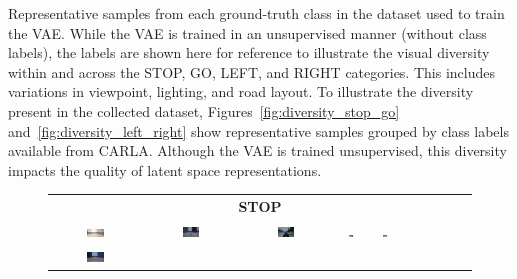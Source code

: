 Representative samples from each ground-truth class in the dataset used to train the VAE. 
While the VAE is trained in an unsupervised manner (without class labels), the labels are shown here for reference to illustrate the visual diversity within and across the STOP, GO, LEFT, and RIGHT categories. This includes variations in viewpoint, lighting, and road layout. To illustrate the diversity present in the collected dataset, Figures~\ref{fig:diversity_stop_go} and~\ref{fig:diversity_left_right} show representative samples grouped by class labels available from CARLA. Although the VAE is trained unsupervised, this diversity impacts the quality of latent space representations.


\begin{figure}[htbp]
    
    \begin{tabular}{cccccccccc}
        \multicolumn{10}{c}{\textbf{STOP}} \\
        \includegraphics[width=0.2\textwidth]{img/diversity/stop_01.png} &
        \includegraphics[width=0.2\textwidth]{img/diversity/stop_04.png} &
        \includegraphics[width=0.2\textwidth]{img/diversity/stop_03.png} &
        \includegraphics[width=0.2\textwidth]{img/diversity/stop_02.png} &
        \includegraphics[width=0.2\textwidth]{img/diversity/stop_06.png} & \\
         \includegraphics[width=0.2\textwidth]{img/diversity/stop_05.png} &

\end{tabular}
\end{figure}
